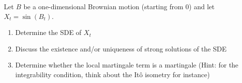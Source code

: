 Let $B$ be a one-dimensional Brownian motion (starting from $0$) and let $X_t=\sin(B_t)$.
\begin{enumerate}
    \item Determine the SDE of $X_t$
    \item Discuss the existence and/or uniqueness of strong solutions of the SDE 
    \item Determine whether the local martingale term is a martingale (Hint: for the integrability condition, think about the Itô isometry for instance)
\end{enumerate}